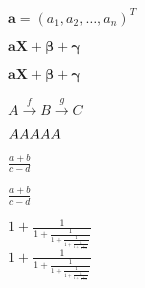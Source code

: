 \documentclass[11pt]{article}
\begin{document}
\unboldmath

 \unboldmath

$\bm{a} = (a_1, a_2, \ldots, a_n)^T$

$\pmb{aX + \beta + \gamma}$

$\boldsymbol{aX + \beta + \gamma}$ 

$A\stackrel{f}{\to}B\stackrel{g}{\to}C$

$A \small{A} \LARGE{A} \Huge{A} \footnotesize{A}$

${\displaystyle\frac{a+b}{c-d}}$

${\frac{\textstyle a+b}{\textstyle c-d}}$

$1+\frac{1}{1+\frac{1}{1+\frac{1}{1+\frac{1}{1+\frac{1}{1+x}}}}}$ \\

$1+\displaystyle\frac{1}{1+\displaystyle\frac{1}{1+\displaystyle\frac{1}{1+\displaystyle\frac{1}{1+\displaystyle\frac{1}{1+x}}}}}$
\end{document}
